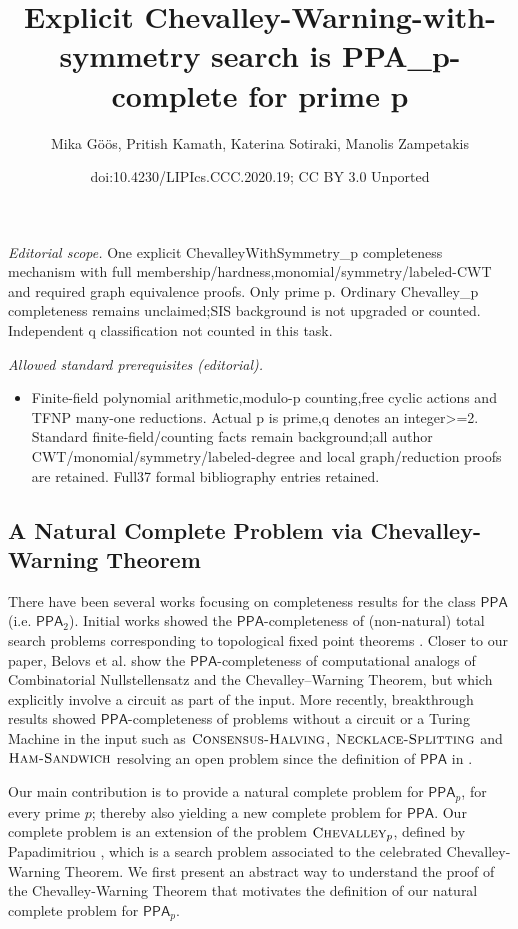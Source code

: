 \documentclass[10pt,a4paper]{article}
\title{Explicit Chevalley-Warning-with-symmetry search is PPA\_p-complete for prime p}
\author{Mika Göös, Pritish Kamath, Katerina Sotiraki, Manolis Zampetakis}
\date{doi:10.4230/LIPIcs.CCC.2020.19; CC BY 3.0 Unported}
\theoremstyle{definition}
\theoremstyle{remark}
\newcommand{\class}[1]{\ensuremath{\mathsf{#1}}\xspace}
\newcommand{\PPA}{\class{PPA}}
\newcommand{\pnum}{p}
\newcommand{\eChevalleyp}{\textsc{Chevalley}_{\pnum}}
\begin{document}
\maketitle
\noindent\textit{Editorial scope.} One explicit ChevalleyWithSymmetry\_p completeness mechanism with full membership/hardness,monomial/symmetry/labeled-CWT and required graph equivalence proofs. Only prime p. Ordinary Chevalley\_p completeness remains unclaimed;SIS background is not upgraded or counted. Independent q classification not counted in this task.\par\medskip
\noindent\textit{Allowed standard prerequisites (editorial).}\begin{itemize}
\item Finite-field polynomial arithmetic,modulo-p counting,free cyclic actions and TFNP many-one reductions. Actual p is prime,q denotes an integer>=2. Standard finite-field/counting facts remain background;all author CWT/monomial/symmetry/labeled-degree and local graph/reduction proofs are retained. Full37 formal bibliography entries retained.
\end{itemize}\medskip
\setcounter{section}{1}
\setcounter{subsection}{1}
\setcounter{theorem}{1}
\subsection{A Natural Complete Problem via Chevalley-Warning Theorem}
\label{sec:intro-complete}

There have been several works focusing on completeness results for the class $\PPA$ (i.e. $\PPA_2$). Initial works showed the
$\PPA$-completeness of (non-natural) total search problems corresponding to topological fixed point theorems
\cite{r24,r1,r19}. Closer to our paper,
Belovs et al. \cite{r8} show the $\PPA$-completeness of computational analogs of Combinatorial Nullstellensatz and the Chevalley--Warning Theorem, but which explicitly
involve a circuit as part of the input. More recently, breakthrough results
showed $\PPA$-completeness of problems without a circuit or a Turing Machine in
the input such as $\textsc{Consensus-Halving}$, $\textsc{Necklace-Splitting}$
and $\textsc{Ham-Sandwich}$
\cite{r20,r21} resolving an open
problem since the definition of $\PPA$ in \cite{r33}.

  Our main contribution is to provide a natural complete problem for $\PPA_p$,
for every prime $p$; thereby also yielding a new complete problem for $\PPA$.
Our complete problem is an extension of the problem $\eChevalleyp$, defined by
Papadimitriou \cite{r33}, which is a search problem
associated to the celebrated Chevalley-Warning Theorem. We first
present an abstract way to understand the proof of the Chevalley-Warning Theorem
that motivates the definition of our natural complete problem for
$\PPA_p$.
\end{document}
